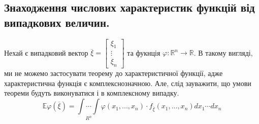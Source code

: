 \newpage

\subsection{Знаходження числових характеристик функцій від випадкових величин.}

\begin{boxteo}
Нехай є випадковий вектор $\overline{\xi} = \begin{bmatrix}
 \xi_1 \\
 \vdots \\
 \xi_n
\end{bmatrix}$ та фукнція $\varphi: \mathbb{R}^n \to \mathbb{R}$. В такому вигляді, ми не можемо застосувати теорему до характеристичної функції, адже характеристична функція є комплекснозначною. Але, слід зауважити, що умови теореми будуть виконуватися і в комплексному випадку.
$$
\mathbb{E} \varphi(\overline{\xi}) = \underset{R^n}{ \int \cdots \int} \varphi (x_1, ..., x_n) \cdot f_{\overline{\xi}}(x_1, ..., x_n)dx_1 \cdots dx_n
$$
\end{boxteo}

